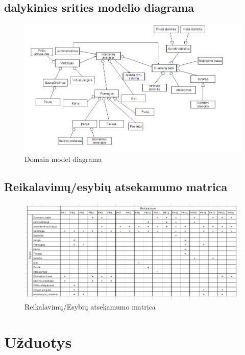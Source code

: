 \documentclass[oneside]{VUMIFPSkursinis}
\begin{document}
\subsection{dalykinies srities modelio diagrama}
\begin{figure}[h]
    \centering
    \includegraphics[width=1\textwidth]{DomainModel.png}
    \caption{Domain model diagrama}
    \label{fig:DomainModel}
\end{figure}
\pagebreak

\subsection{Reikalavimų/esybių atsekamumo matrica}	
\begin{figure}[h]
    \centering
    \includegraphics[width=1\textwidth]{Reikalavimai_Esybes.png}
    \caption{Reikalavimų/Esybių atsekamumo matrica}
    \label{fig:r/e_matrica}
\end{figure}
\section{Užduotys}
\end{document}
